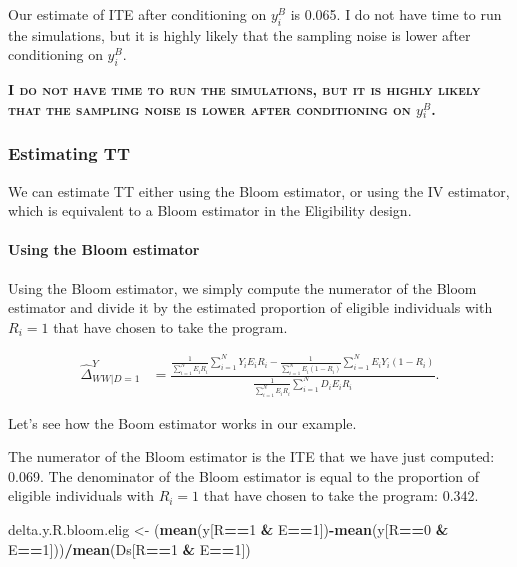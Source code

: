 \documentclass[]{book}
\newenvironment{Shaded}{\begin{snugshade}}{\end{snugshade}}
\newcommand{\DecValTok}[1]{\textcolor[rgb]{0.00,0.00,0.81}{#1}}
\newcommand{\KeywordTok}[1]{\textcolor[rgb]{0.13,0.29,0.53}{\textbf{#1}}}
\newcommand{\NormalTok}[1]{#1}
\newcommand{\OperatorTok}[1]{\textcolor[rgb]{0.81,0.36,0.00}{\textbf{#1}}}
\newcommand{\StringTok}[1]{\textcolor[rgb]{0.31,0.60,0.02}{#1}}
\let\oldparagraph\paragraph
\renewcommand{\paragraph}[1]{\oldparagraph{#1}\mbox{}}
\theoremstyle{definition}
\theoremstyle{definition}
\theoremstyle{definition}
\theoremstyle{remark}
\let\BeginKnitrBlock\begin \let\EndKnitrBlock\end
\begin{document}
Our estimate of ITE after conditioning on \(y_i^B\) is 0.065.
I do not have time to run the simulations, but it is highly likely that the sampling noise is lower after conditioning on \(y_i^B\).

\textbf{\textsc{I do not have time to run the simulations, but it is highly likely that the sampling noise is lower after conditioning on \(y_i^B\).}}

\hypertarget{estimating-tt-1}{%
\subsubsection{Estimating TT}\label{estimating-tt-1}}

We can estimate TT either using the Bloom estimator, or using the IV estimator, which is equivalent to a Bloom estimator in the Eligibility design.

\hypertarget{using-the-bloom-estimator}{%
\paragraph{Using the Bloom estimator}\label{using-the-bloom-estimator}}

Using the Bloom estimator, we simply compute the numerator of the Bloom estimator and divide it by the estimated proportion of eligible individuals with \(R_i=1\) that have chosen to take the program.

\begin{align*}
  \hat{\Delta}^Y_{WW|D=1} & = \frac{\frac{1}{\sum_{i=1}^N E_iR_i}\sum_{i=1}^N Y_iE_iR_i-\frac{1}{\sum_{i=1}^N E_i(1-R_i)}\sum_{i=1}^N E_iY_i(1-R_i)}{\frac{1}{\sum_{i=1}^N E_iR_i}\sum_{i=1}^N D_iE_iR_i}.
\end{align*}

\BeginKnitrBlock{example}
\protect\hypertarget{exm:unnamed-chunk-97}{}{\label{exm:unnamed-chunk-97} }Let's see how the Boom estimator works in our example.
\EndKnitrBlock{example}

The numerator of the Bloom estimator is the ITE that we have just computed: 0.069.
The denominator of the Bloom estimator is equal to the proportion of eligible individuals with \(R_i=1\) that have chosen to take the program: 0.342.

\begin{Shaded}
\begin{Highlighting}[]
\NormalTok{delta.y.R.bloom.elig <-}\StringTok{ }\NormalTok{(}\KeywordTok{mean}\NormalTok{(y[R}\OperatorTok{==}\DecValTok{1} \OperatorTok{&}\StringTok{ }\NormalTok{E}\OperatorTok{==}\DecValTok{1}\NormalTok{])}\OperatorTok{-}\KeywordTok{mean}\NormalTok{(y[R}\OperatorTok{==}\DecValTok{0} \OperatorTok{&}\StringTok{ }\NormalTok{E}\OperatorTok{==}\DecValTok{1}\NormalTok{]))}\OperatorTok{/}\KeywordTok{mean}\NormalTok{(Ds[R}\OperatorTok{==}\DecValTok{1} \OperatorTok{&}\StringTok{ }\NormalTok{E}\OperatorTok{==}\DecValTok{1}\NormalTok{])}
\end{Highlighting}
\end{Shaded}
\end{document}
